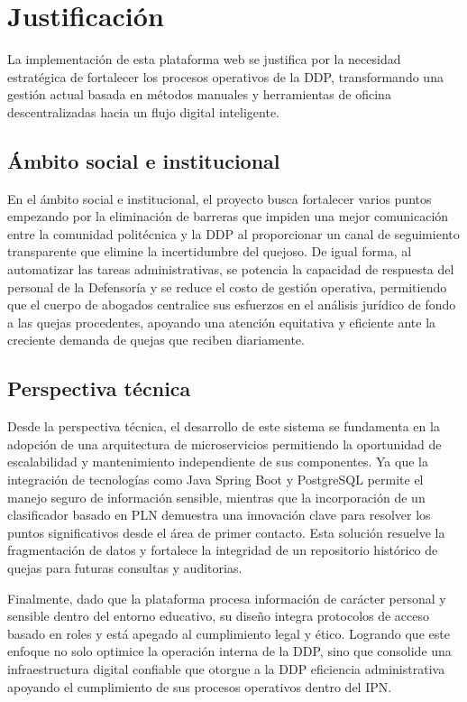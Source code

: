 \section{Justificación}

    La implementación de esta plataforma web se justifica por la necesidad estratégica de fortalecer los procesos operativos de la DDP, transformando una gestión actual basada en métodos manuales y herramientas de oficina descentralizadas hacia un flujo digital inteligente. 
    
    \subsection{Ámbito social e institucional}
    
    En el ámbito social e institucional, el proyecto busca fortalecer varios puntos empezando por la eliminación de barreras que impiden una mejor comunicación entre la comunidad politécnica y la DDP al proporcionar un canal de seguimiento transparente que elimine la incertidumbre del quejoso. De igual forma, al automatizar las tareas administrativas, se potencia la capacidad de respuesta del personal de la Defensoría y se reduce el costo de gestión operativa, permitiendo que el cuerpo de abogados centralice sus esfuerzos en el análisis jurídico de fondo a las quejas procedentes, apoyando una atención equitativa y eficiente ante la creciente demanda de quejas que reciben diariamente.
    
    \subsection{Perspectiva técnica}
    
    Desde la perspectiva técnica, el desarrollo de este sistema se fundamenta en la adopción de una arquitectura de microservicios permitiendo la oportunidad de escalabilidad y mantenimiento independiente de sus componentes. Ya que la integración de tecnologías como Java Spring Boot y PostgreSQL permite el manejo seguro de información sensible, mientras que la incorporación de un clasificador basado en PLN demuestra una innovación clave para resolver los puntos significativos desde el área de primer contacto. Esta solución resuelve la fragmentación de datos y fortalece la integridad de un repositorio histórico de quejas para futuras consultas y auditorias.
    
    Finalmente, dado que la plataforma procesa información de carácter personal y sensible dentro del entorno educativo, su diseño integra protocolos de acceso basado en roles y está apegado al cumplimiento legal y ético. Logrando que este enfoque no solo optimice la operación interna de la DDP, sino que consolide una infraestructura digital confiable que otorgue a la DDP eficiencia administrativa apoyando el cumplimiento de sus procesos operativos dentro del IPN.

